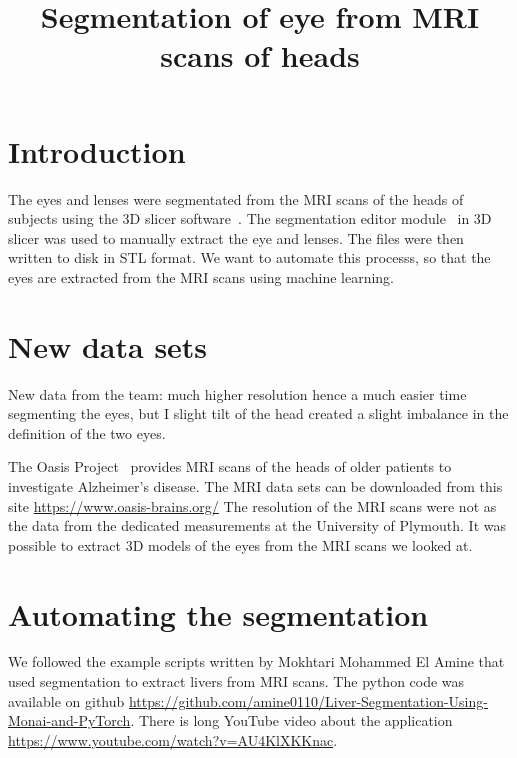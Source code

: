 \documentclass[12pt]{article}
\begin{document}
\title{Segmentation of eye from MRI scans of heads}
\date{}

\maketitle


\section{Introduction}

The eyes and lenses were segmentated from the MRI scans of the heads
of subjects using the 3D slicer software~\cite{kikinis20133d}.  The
segmentation editor module~\cite{pinter2019polymorph} in 3D slicer was
used to manually extract the eye and lenses.  The files were then
written to disk in STL format.  We want to automate this processs, so
that the eyes are extracted from the MRI scans using machine learning.


\section{New data sets}

New data from the team: much higher resolution hence a much easier
time segmenting the eyes, but I slight tilt of the head created a
slight imbalance in the definition of the two eyes.


The Oasis Project~\cite{van2021mri} provides MRI scans of the heads of
older patients to investigate Alzheimer's disease.  The MRI data sets
can be downloaded from this site \url{https://www.oasis-brains.org/}
The resolution of the MRI scans were not as the data from the
dedicated measurements at the University of Plymouth.
It was possible to extract 3D models of the eyes
from the MRI scans we looked at.

\section{Automating the segmentation}

We followed the example scripts written by
Mokhtari Mohammed El Amine that used segmentation to extract
livers from MRI scans. The python code was available
on github
\url{https://github.com/amine0110/Liver-Segmentation-Using-Monai-and-PyTorch}. There
is long YouTube video about the application
\url{https://www.youtube.com/watch?v=AU4KlXKKnac}.
\end{document}

